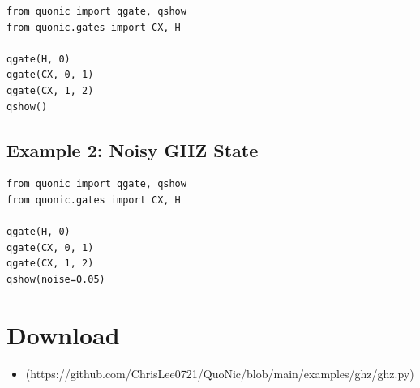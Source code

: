 \documentclass[12pt,a4paper]{article}
\begin{document}
\begin{verbatim}
from quonic import qgate, qshow
from quonic.gates import CX, H

qgate(H, 0)
qgate(CX, 0, 1)
qgate(CX, 1, 2)
qshow()
\end{verbatim}

\subsection{Example 2: Noisy GHZ State}

\begin{verbatim}
from quonic import qgate, qshow
from quonic.gates import CX, H

qgate(H, 0)
qgate(CX, 0, 1)
qgate(CX, 1, 2)
qshow(noise=0.05)
\end{verbatim}

\section{Download}

\begin{itemize}
  \item [ghz.py](https://github.com/ChrisLee0721/QuoNic/blob/main/examples/ghz/ghz.py)
\end{itemize}
\end{document}
